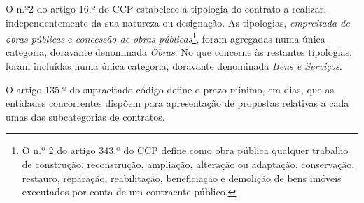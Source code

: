 


O n.º2 do artigo 16.º do CCP estabelece a tipologia do contrato a realizar, independentemente da sua natureza ou designação. As tipologias, \textit{empreitada de obras públicas} e \textit{concessão de obras públicas}\footnote{O n.º 2 do artigo 343.º do CCP define como obra pública qualquer trabalho de construção, reconstrução, ampliação, alteração ou adaptação, conservação, restauro, reparação, reabilitação, beneficiação e demolição de bens imóveis executados por conta de um contraente público.}, foram agregadas numa única categoria, doravante denominada \textit{Obras}. 
No que concerne às restantes tipologias, foram incluídas numa única categoria, doravante denominada \textit{Bens e Serviços}.

O artigo 135.º do supracitado código define o prazo mínimo, em dias, que as entidades concorrentes dispõem para apresentação de propostas relativas a cada umas das subcategorias de contratos. 

